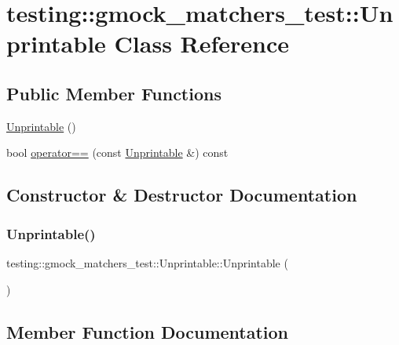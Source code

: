 \hypertarget{classtesting_1_1gmock__matchers__test_1_1Unprintable}{}\section{testing\+::gmock\+\_\+matchers\+\_\+test\+::Unprintable Class Reference}
\label{classtesting_1_1gmock__matchers__test_1_1Unprintable}
\subsection*{Public Member Functions}
\begin{DoxyCompactItemize}
\item 
\mbox{\hyperlink{classtesting_1_1gmock__matchers__test_1_1Unprintable_a70bca9e23271621ada7f52a4d190677a}{Unprintable}} ()
\item 
bool \mbox{\hyperlink{classtesting_1_1gmock__matchers__test_1_1Unprintable_ae09dc235a5341b07f0299bd24ee37e2d}{operator==}} (const \mbox{\hyperlink{classtesting_1_1gmock__matchers__test_1_1Unprintable}{Unprintable}} \&) const
\end{DoxyCompactItemize}


\subsection{Constructor \& Destructor Documentation}
\mbox{\label{classtesting_1_1gmock__matchers__test_1_1Unprintable_a70bca9e23271621ada7f52a4d190677a}} 
\subsubsection{\texorpdfstring{Unprintable()}{Unprintable()}}
{\footnotesize\ttfamily testing\+::gmock\+\_\+matchers\+\_\+test\+::\+Unprintable\+::\+Unprintable (\begin{DoxyParamCaption}{ }\end{DoxyParamCaption})\hspace{0.3cm}{\ttfamily [inline]}}



\subsection{Member Function Documentation}
\mbox{\label{classtesting_1_1gmock__matchers__test_1_1Unprintable_ae09dc235a5341b07f0299bd24ee37e2d}} 
